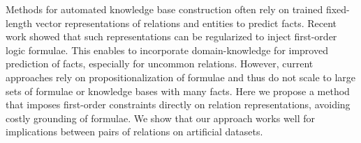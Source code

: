 Methods for automated knowledge base construction often rely on trained fixed-length vector representations of relations and entities to predict facts. Recent work showed that such representations can be regularized to inject first-order logic formulae. This enables to incorporate domain-knowledge for improved prediction of facts, especially for uncommon relations. However, current approaches rely on propositionalization of formulae and thus do not scale to large sets of formulae or knowledge bases with many facts. Here we propose a method that imposes first-order constraints directly on relation representations, avoiding costly grounding of formulae. We show that our approach works well for implications between pairs of relations on artificial datasets.
